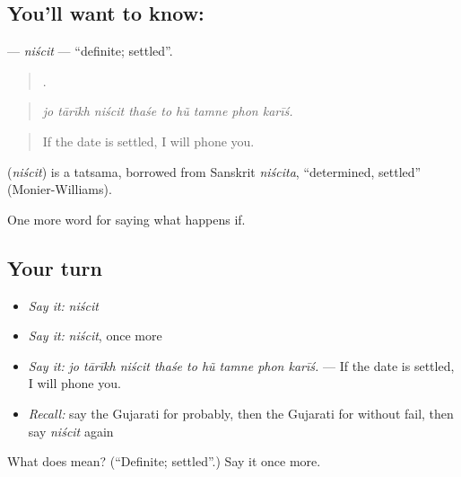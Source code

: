 \subsection*{You'll want to know: }
\textbf{} — \emph{niścit} — \textquotedblleft{}definite; settled\textquotedblright{}.

\begin{quote}
        .
\end{quote}

\begin{quote}
\emph{jo tārīkh niścit thaśe to hũ tamne phon karīś.}
\end{quote}

\begin{quote}
If the date is settled, I will phone you.
\end{quote}

\begin{cousinweb}
\textbf{} (\emph{niścit}) is a tatsama, borrowed from Sanskrit \emph{niścita}, \textquotedblleft{}determined, settled\textquotedblright{} (Monier-Williams).
\end{cousinweb}

\begin{grammarlens}[title={What you've built}]
One more word for saying what happens if.
\end{grammarlens}

\subsection*{Your turn}
\begin{itemize}
\raggedright
  \item \emph{Say it:} \emph{niścit}
  \item \emph{Say it:} \emph{niścit}, once more
  \item \emph{Say it:} \emph{jo tārīkh niścit thaśe to hũ tamne phon karīś.} — If the date is settled, I will phone you.
  \item \emph{Recall:} say the Gujarati for probably, then the Gujarati for without fail, then say \emph{niścit} again
\end{itemize}

\begin{tcolorbox}[breakable,colback=teal!4,colframe=teal!35!black,title={Before you move on}]
What does  mean? (\textquotedblleft{}Definite; settled\textquotedblright{}.) Say it once more.
\end{tcolorbox}
